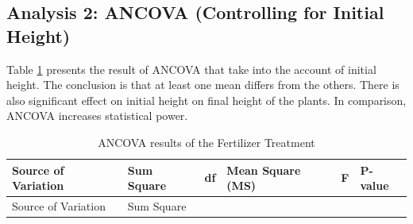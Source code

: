 \documentclass[
]{book}
\begin{document}
\subsection{Analysis 2: ANCOVA (Controlling for Initial Height)}\label{analysis-2-ancova-controlling-for-initial-height}

Table \ref{tab:ancova-tab} presents the result of ANCOVA that take into the account of initial height. The conclusion is that at least one mean differs from the others. There is also significant effect on initial height on final height of the plants. In comparison, ANCOVA increases statistical power.

\begin{longtable}[]{@{}
  >{\raggedright\arraybackslash}p{}
  >{\raggedright\arraybackslash}p{}
  >{\raggedright\arraybackslash}p{}
  >{\raggedright\arraybackslash}p{}
  >{\raggedright\arraybackslash}p{}
  >{\raggedright\arraybackslash}p{}@{}}
\caption{\label{tab:ancova-tab} ANCOVA results of the Fertilizer Treatment}\tabularnewline
\toprule\noalign{}
\begin{minipage}[b]{\linewidth}\raggedright
Source of Variation
\end{minipage} & \begin{minipage}[b]{\linewidth}\raggedright
Sum Square
\end{minipage} & \begin{minipage}[b]{\linewidth}\raggedright
df
\end{minipage} & \begin{minipage}[b]{\linewidth}\raggedright
Mean Square (MS)
\end{minipage} & \begin{minipage}[b]{\linewidth}\raggedright
F
\end{minipage} & \begin{minipage}[b]{\linewidth}\raggedright
P-value
\end{minipage} \\
\midrule\noalign{}
\endfirsthead
\toprule\noalign{}
\begin{minipage}[b]{\linewidth}\raggedright
Source of Variation
\end{minipage} & \begin{minipage}[b]{\linewidth}\raggedright
Sum Square
\end{minipage} & \begin{minipage}[b]{\linewidth}\raggedright

\end{minipage}
\end{longtable}
\end{document}
